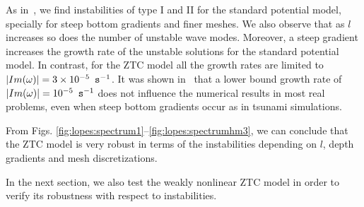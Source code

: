 As in~\cite{LovholtPedersen2009}, we find
instabilities of type I and II  for the standard
potential model, specially for steep bottom gradients and finer meshes.
We also observe that as $l$ increases so does the number of
unstable wave modes.  Moreover, a steep gradient increases the
growth rate of the unstable solutions for the standard
potential model.
In contrast, for the ZTC model  all the growth rates are
limited to $|Im(\omega)|=3\times 10^{-5}\,~{\tt s}^{-1}$.
It was shown in~\cite{LovholtPedersen2009} that a
lower bound growth rate of $|Im(\omega)|=10^{-5}\,~{\tt
s}^{-1}$ does not influence the numerical results in most
real problems, even when steep bottom gradients occur as in
tsunami simulations.

From
 Figs. \ref{fig:lopes:spectrum1}--\ref{fig:lopes:spectrumhm3},
 we can conclude that the ZTC model is very robust in terms
 of the instabilities depending on $l$, depth gradients and
 mesh discretizations.

In the next section, we  also test the weakly nonlinear ZTC
model in order to verify its robustness with respect to instabilities.


